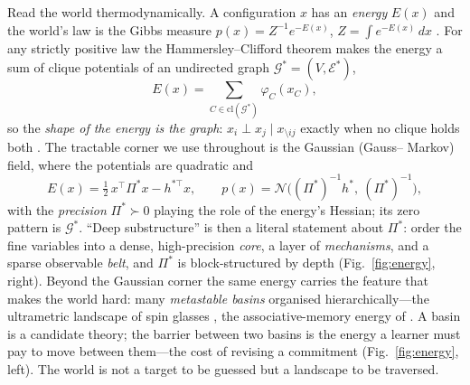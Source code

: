 \documentclass[11pt]{article}
\theoremstyle{definition}
\theoremstyle{plain}
\begin{document}
Read the world thermodynamically. A configuration $x$ has an \emph{energy} $E(x)$ and the world's
law is the Gibbs measure $p(x)=Z^{-1}e^{-E(x)}$, $Z=\int e^{-E(x)}\,dx$
\citep{jaynes1957}. For any strictly positive law the Hammersley--Clifford theorem makes the energy
a sum of clique potentials of an undirected graph $\mathcal G^\ast=(V,\mathcal E^\ast)$,
\begin{equation}
E(x)=\sum_{C\in\mathrm{cl}(\mathcal G^\ast)}\varphi_C(x_C),
\label{eq:hc}
\end{equation}
so the \emph{shape of the energy is the graph}: $x_i\perp x_j\mid x_{\setminus ij}$ exactly when no
clique holds both \citep{besag1974}. The tractable corner we use throughout is the Gaussian (Gauss--
Markov) field, where the potentials are quadratic and
\begin{equation}
E(x)=\tfrac12\,x^\top\Pi^\ast x-h^{\ast\top}x,\qquad
p(x)=\mathcal N\!\big((\Pi^\ast)^{-1}h^\ast,\ (\Pi^\ast)^{-1}\big),
\label{eq:gmrf}
\end{equation}
with the \emph{precision} $\Pi^\ast\succ0$ playing the role of the energy's Hessian; its zero pattern
is $\mathcal G^\ast$. ``Deep substructure'' is then a literal statement about $\Pi^\ast$: order the
fine variables into a dense, high-precision \emph{core}, a layer of \emph{mechanisms}, and a sparse
observable \emph{belt}, and $\Pi^\ast$ is block-structured by depth (Fig.~\ref{fig:energy}, right).
Beyond the Gaussian corner the same energy carries the feature that makes the world hard: many
\emph{metastable basins} organised hierarchically---the ultrametric landscape of spin glasses
\citep{mpv1987}, the associative-memory energy of \citet{hopfield1982}. A basin is a candidate
theory; the barrier between two basins is the energy a learner must pay to move between them---the
cost of revising a commitment (Fig.~\ref{fig:energy}, left). The world is not a target to be guessed
but a landscape to be traversed.
\end{document}
